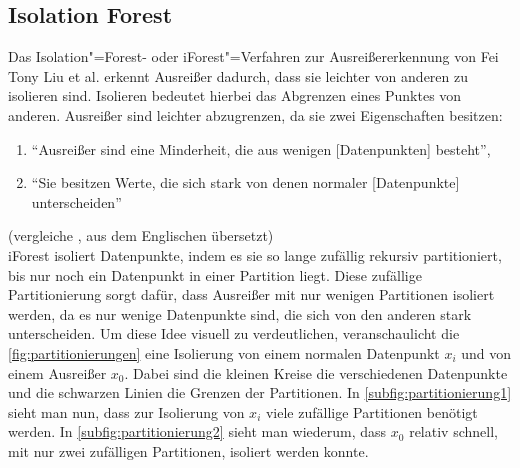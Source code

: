 \subsection{Isolation Forest}
Das Isolation"=Forest- oder iForest"=Verfahren zur Ausreißererkennung von Fei Tony Liu et al. \cite{iForest} erkennt Ausreißer dadurch, dass sie leichter von anderen zu isolieren sind. Isolieren bedeutet hierbei das Abgrenzen eines Punktes von anderen. Ausreißer sind leichter abzugrenzen, da sie zwei Eigenschaften besitzen:
\begin{enumerate}
    \item "`Ausreißer sind eine Minderheit, die aus wenigen [Datenpunkten] besteht"',
    \item "`Sie besitzen Werte, die sich stark von denen normaler [Datenpunkte] unterscheiden"'
\end{enumerate}
(vergleiche \cite[Ch. 1]{iForest}, aus dem Englischen übersetzt) \\
iForest isoliert Datenpunkte, indem es sie so lange zufällig rekursiv partitioniert, bis nur noch ein Datenpunkt in einer Partition liegt. Diese zufällige Partitionierung sorgt dafür, dass Ausreißer mit nur wenigen Partitionen isoliert werden, da es nur wenige Datenpunkte sind, die sich von den anderen stark unterscheiden. Um diese Idee visuell zu verdeutlichen, veranschaulicht die \autoref{fig:partitionierungen} eine Isolierung von einem normalen Datenpunkt $x_i$ und von einem Ausreißer $x_0$. Dabei sind die kleinen Kreise die verschiedenen Datenpunkte und die schwarzen Linien die Grenzen der Partitionen. In \autoref{subfig:partitionierung1} sieht man nun, dass zur Isolierung von $x_i$ viele zufällige Partitionen benötigt werden. In \autoref{subfig:partitionierung2} sieht man wiederum, dass $x_0$ relativ schnell, mit nur zwei zufälligen Partitionen, isoliert werden konnte.
